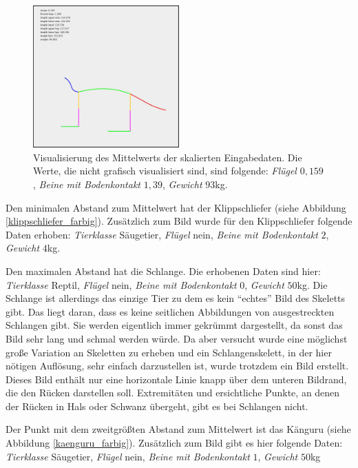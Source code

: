  \begin{figure}
  \centering
  \includegraphics[width=0.5\textwidth]{../PCA/mean_log_weight_downscaled_wings_legs_and_weight(onlyBox,stroke4).jpg}
  \caption{Visualisierung des Mittelwerts der skalierten Eingabedaten. Die Werte, die nicht grafisch visualisiert sind, sind folgende: \emph{Flügel} $0{,}159$, \emph{Beine mit Bodenkontakt} $1{,}39$, \emph{Gewicht} $93$kg.}
  \label{mean}
 \end{figure}
 
 Den minimalen Abstand zum Mittelwert hat der Klippschliefer (siehe Abbildung \ref{klippschliefer_farbig}). Zusätzlich zum Bild wurde für den Klippschliefer folgende Daten erhoben:
 \emph{Tierklasse} Säugetier, \emph{Flügel} nein, \emph{Beine mit Bodenkontakt} $2$, \emph{Gewicht} $4$kg.
 
 Den maximalen Abstand hat die Schlange. Die erhobenen Daten sind hier:
 \emph{Tierklasse} Reptil, \emph{Flügel} nein, \emph{Beine mit Bodenkontakt} $0$, \emph{Gewicht} $50$kg.
 Die Schlange ist allerdings das einzige Tier zu dem es kein "`echtes"' Bild des Skeletts gibt. Das liegt daran, dass es keine seitlichen Abbildungen von ausgestreckten Schlangen gibt. Sie werden eigentlich immer gekrümmt dargestellt, da sonst das Bild sehr lang und schmal werden würde. 
 Da aber versucht wurde eine möglichst große Variation an Skeletten zu erheben und ein Schlangenskelett, in der hier nötigen Auflösung, sehr einfach darzustellen ist, wurde trotzdem ein Bild erstellt. Dieses Bild enthält nur eine horizontale Linie knapp über dem unteren Bildrand, die den Rücken darstellen soll. Extremitäten und ersichtliche Punkte, an denen der Rücken in Hals oder Schwanz übergeht, gibt es bei Schlangen nicht.
 
 Der Punkt mit dem zweitgrößten Abstand zum Mittelwert ist das Känguru (siehe Abbildung \ref{kaenguru_farbig}). Zusätzlich zum Bild gibt es hier folgende Daten:
  \emph{Tierklasse} Säugetier, \emph{Flügel} nein, \emph{Beine mit Bodenkontakt} $1$, \emph{Gewicht} $50$kg
  
